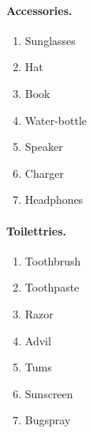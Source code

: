 \documentclass[12pt,english]{article}
\begin{document}
\paragraph{Accessories.}
\begin{enumerate} 
	\item{Sunglasses }
	\item{Hat }
	\item{Book }
	\item{Water-bottle}
	\item{Speaker}
	\item{Charger}
	\item{Headphones}
\end{enumerate}

\paragraph{Toilettries.}
\begin{enumerate} 
	\item{Toothbrush }
	\item{Toothpaste }
	\item{Razor }
	\item{Advil }
	\item{Tums }
	\item{Sunscreen }
	\item{Bugspray }
\end{enumerate}
\end{document}
